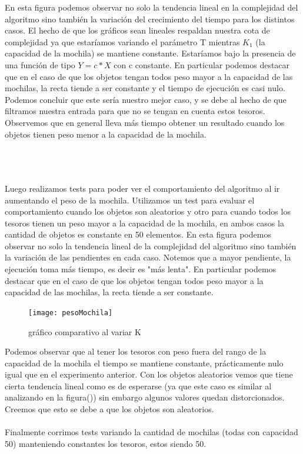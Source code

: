 \documentclass[spanish,12pt]{article}
\begin{document}
En esta figura podemos observar no solo la tendencia lineal en la complejidad del algoritmo sino también la variación del crecimiento del tiempo para los distintos casos.
El hecho de que los gráficos sean lineales respaldan nuestra cota de complejidad ya que estaríamos variando el parámetro T mientras $K_1$ (la capacidad de la mochila) se mantiene constante. Estaríamos bajo la presencia de una función de tipo $Y=c*X$ con c constante.
En particular podemos destacar que en el caso de que los objetos tengan todos peso mayor a la capacidad de las mochilas, la recta tiende a ser constante y el tiempo de ejecución es casi nulo.
Podemos concluir que este sería nuestro mejor caso, y se debe al hecho de que filtramos nuestra entrada para que no se tengan en cuenta estos tesoros.
Observemos que en general lleva más tiempo obtener un resultado cuando los objetos tienen peso menor a la capacidad de la mochila.

\\
\\
\\
Luego realizamos tests para poder ver el comportamiento del algoritmo al ir aumentando el peso de la mochila. Utilizamos un test para evaluar el comportamiento cuando los objetos son aleatorios y otro para cuando todos los tesoros tienen un peso mayor a la capacidad de la mochila, en ambos casos la cantidad de objetos es constante en 50 elementos.
En esta figura podemos observar no solo la tendencia lineal de la complejidad del algoritmo sino también la variación de las pendientes en cada caso. Notemos que a mayor pendiente, la ejecución toma más tiempo, es decir es "más lenta".
En particular podemos destacar que en el caso de que los objetos tengan todos peso mayor a la capacidad de las mochilas, la recta tiende a ser constante.

\begin{figure}[H]
\centering
\texttt{[image: pesoMochila]}
\caption{gráfico comparativo al variar K}
\end{figure}

Podemos observar que al tener los tesoros con peso fuera del rango de la capacidad de la mochila el tiempo se mantiene constante, prácticamente nulo igual que en el experimento anterior. Con los objetos aleatorios vemos que tiene cierta tendencia lineal como es de esperarse (ya que este caso es similar al analizando en la figura()) sin embargo algunos valores quedan distorcionados. Creemos que esto se debe a que los objetos son aleatorios.
\\
\\
Finalmente corrimos tests variando la cantidad de mochilas (todas con capacidad 50) manteniendo constantes los tesoros, estos siendo 50.
\end{document}
